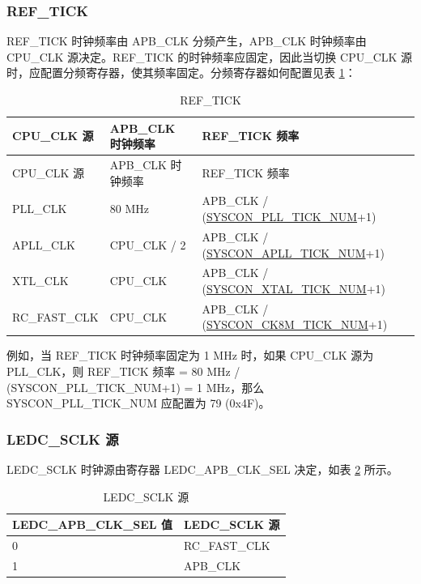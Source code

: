 \documentclass[main\_\_CN.tex]{subfiles}
\begin{document}
\subsubsection{REF\_TICK}\label{sec:ref_tick}

REF\_TICK 时钟频率由 APB\_CLK 分频产生，APB\_CLK 时钟频率由 CPU\_CLK 源决定。REF\_TICK 的时钟频率应固定，因此当切换 CPU\_CLK 源时，应配置分频寄存器，使其频率固定。分频寄存器如何配置见表 \ref{table:ref_tick}：

\begin{longtable}[c]{|l|l|l|}
      \caption{REF\_TICK}
    \label{table:ref_tick}
        \\\hline
        \rowcolor{lightgray}
        CPU\_CLK 源 & APB\_CLK 时钟频率 & REF\_TICK 频率\\
        \hline
        \endfirsthead
        \hline
        \rowcolor{lightgray}
        CPU\_CLK 源 & APB\_CLK 时钟频率 & REF\_TICK 频率\\
        \hline
        \endhead
        \endfoot
        PLL\_CLK & 80 MHz & APB\_CLK / (\hyperref[fielddesc:SYSCONPLLTICKNUM]{SYSCON\_PLL\_TICK\_NUM}+1)\\
        \hline
        APLL\_CLK & CPU\_CLK / 2 & APB\_CLK / (\hyperref[fielddesc:SYSCONAPLLTICKNUM]{SYSCON\_APLL\_TICK\_NUM}+1)\\
        \hline
        XTL\_CLK & CPU\_CLK & APB\_CLK / (\hyperref[fielddesc:SYSCONXTALTICKNUM]{SYSCON\_XTAL\_TICK\_NUM}+1)\\
        \hline
        RC\_FAST\_CLK & CPU\_CLK & APB\_CLK / (\hyperref[fielddesc:SYSCONCK8MTICKNUM]{SYSCON\_CK8M\_TICK\_NUM}+1)\\
        \hline
\end{longtable}

例如，当 REF\_TICK 时钟频率固定为 1 MHz 时，如果 CPU\_CLK 源为 PLL\_CLK，则 REF\_TICK 频率 = 80 MHz / (SYSCON\_PLL\_TICK\_NUM+1) = 1 MHz，那么 SYSCON\_PLL\_TICK\_NUM 应配置为 79 (0x4F)。


\subsubsection{LEDC\_SCLK 源}

LEDC\_SCLK 时钟源由寄存器 LEDC\_APB\_CLK\_SEL 决定，如表 \ref{table:led_sclk} 所示。

\begin{longtable}[c]{|l|l|} \caption{LEDC\_SCLK 源}
    \label{table:led_sclk}
        \\\hline
        \rowcolor{lightgray}
        LEDC\_APB\_CLK\_SEL 值 & LEDC\_SCLK 源  \\
        \hline
        0 & RC\_FAST\_CLK \\
        \hline
        1 & APB\_CLK \\
        \hline
\end{longtable}
\end{document}
